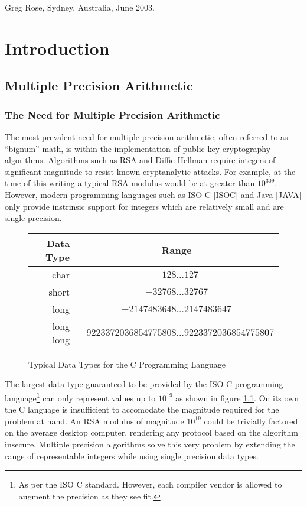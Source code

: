 \documentclass[b5paper]{book}
\begin{document}
\begin{flushright}
Greg Rose, Sydney, Australia, June 2003. 
\end{flushright}

\mainmatter
\pagestyle{headings}
\chapter{Introduction}
\section{Multiple Precision Arithmetic}
\subsection{The Need for Multiple Precision Arithmetic}
The most prevalent need for multiple precision arithmetic, often referred to as ``bignum'' math, is within the implementation
of public-key cryptography algorithms.   Algorithms such as RSA \cite{RSAREF} and Diffie-Hellman \cite{DHREF} require 
integers of significant magnitude to resist known cryptanalytic attacks.  For example, at the time of this writing a 
typical RSA modulus would be at greater than $10^{309}$.  However, modern programming languages such as ISO C \ref{ISOC} and 
Java \ref{JAVA} only provide instrinsic support for integers which are relatively small and are single precision.

\begin{figure}[!here]
\begin{center}
\begin{tabular}{|r|c|}
\hline \textbf{Data Type} & \textbf{Range} \\
\hline char  & $-128 \ldots 127$ \\
\hline short & $-32768 \ldots 32767$ \\
\hline long  & $-2147483648 \ldots 2147483647$ \\
\hline long long & $-9223372036854775808 \ldots 9223372036854775807$ \\
\hline
\end{tabular}
\end{center}
\caption{Typical Data Types for the C Programming Language}
\label{fig:ISOC}
\end{figure}

The largest data type guaranteed to be provided by the ISO C programming 
language\footnote{As per the ISO C standard.  However, each compiler vendor is allowed to augment the precision as they 
see fit.}  can only represent values up to $10^{19}$ as shown in figure \ref{fig:ISOC}. On its own the C language is 
insufficient to accomodate the magnitude required for the problem at hand.  An RSA modulus of magnitude $10^{19}$ could be 
trivially factored on the average desktop computer, rendering any protocol based on the algorithm insecure.  Multiple 
precision algorithms solve this very problem by extending the range of representable integers while using single precision 
data types.
\end{document}
